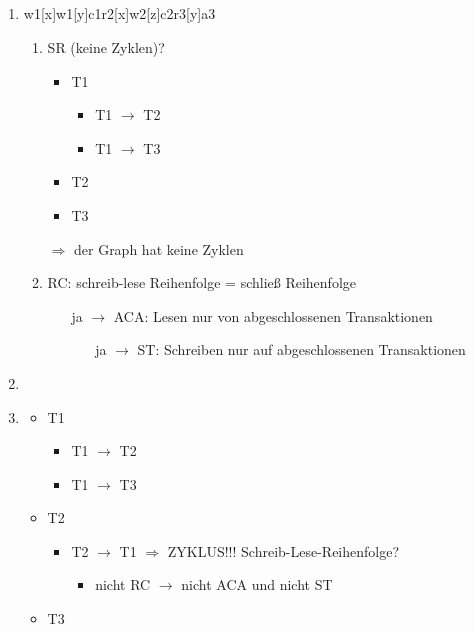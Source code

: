 \subsection{}
\begin{enumerate}
	\item w1[x]w1[y]c1r2[x]w2[z]c2r3[y]a3
	\begin{enumerate}
		\item SR (keine Zyklen)?
		\begin{itemize}
			\item T1
			\begin{itemize}
				\item T1 $\to$ T2
				\item T1 $\to$ T3
			\end{itemize}
			\item T2
			\item T3
		\end{itemize}
		$\Rightarrow$ der Graph hat keine Zyklen
	\item RC: schreib-lese Reihenfolge = schließ Reihenfolge
	\begin{itemize}
		\item[ja] $\to$ ACA: Lesen nur von abgeschlossenen Transaktionen
		\begin{itemize}
			\item[ja] $\to$ ST: Schreiben nur auf abgeschlossenen Transaktionen
		\end{itemize}
	\end{itemize}
	\end{enumerate}
	\item
	\item 
	\begin{itemize}
			\item T1
			\begin{itemize}
				\item T1 $\to$ T2
				\item T1 $\to$ T3
			\end{itemize}
			\item T2
			\begin{itemize}
				\item T2 $\to$ T1 $\Rightarrow$ ZYKLUS!!! Schreib-Lese-Reihenfolge?
				\begin{itemize}
					\item nicht RC $\to$ nicht ACA und nicht ST
				\end{itemize}
			\end{itemize}
			\item T3
	\end{itemize}
\end{enumerate}

